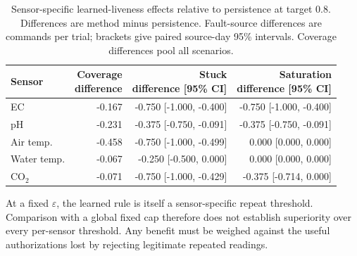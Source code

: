 \begin{table}[!htbp]\centering\small\setlength{\tabcolsep}{4pt}

\caption{Sensor-specific learned-liveness effects relative to persistence at target 0.8. Differences are method minus persistence. Fault-source differences are commands per trial; brackets give paired source-day 95\% intervals. Coverage differences pool all scenarios.}

\label{tab:liveness-sensors}

\begin{tabular}{lrrr}\toprule

Sensor & \shortstack{Coverage\\difference} & \shortstack{Stuck\\difference [95\% CI]} & \shortstack{Saturation\\difference [95\% CI]}\\\midrule

EC & -0.167 & -0.750 [-1.000, -0.400] & -0.750 [-1.000, -0.400]\\

pH & -0.231 & -0.375 [-0.750, -0.091] & -0.375 [-0.750, -0.091]\\

Air temp. & -0.458 & -0.750 [-1.000, -0.499] & 0.000 [0.000, 0.000]\\

Water temp. & -0.067 & -0.250 [-0.500, 0.000] & 0.000 [0.000, 0.000]\\

CO$_2$ & -0.071 & -0.750 [-1.000, -0.429] & -0.375 [-0.714, 0.000]\\

\bottomrule\end{tabular}\end{table}

At a fixed $\varepsilon$, the learned rule is itself a sensor-specific repeat threshold. Comparison with a global fixed cap therefore does not establish superiority over every per-sensor threshold. Any benefit must be weighed against the useful authorizations lost by rejecting legitimate repeated readings.
